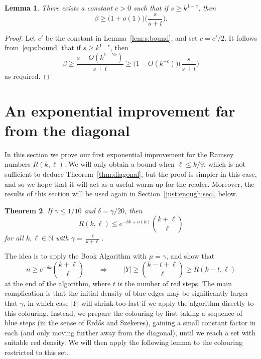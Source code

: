 \documentclass[12pt,reqno]{amsart}
\newtheorem{theorem}{Theorem}[section]
\newtheorem{lemma}[theorem]{Lemma}
\theoremstyle{definition}
\theoremstyle{remark}
\newcommand\N{\mathbb{N}}
\renewcommand{\le}{\leqslant}
\renewcommand{\ge}{\geqslant}
\def\N{\mathbb{N}}
\begin{document}
\begin{lemma}\label{lem:beta:bound}
There exists a constant $c > 0$ such that if $s \ge k^{1-c}$, then
$$\beta \ge \big(1 + o(1) \big) \bigg( \frac{s}{s + t} \bigg).$$ %
\end{lemma}

\begin{proof}
Let $c'$ be the constant in Lemma~\ref{lem:s:bound}, and set $c = c'/2$. It follows from~\eqref{eq:s:bound} that if $s \ge k^{1-c}$, then
$$\beta \ge \frac{s - O(k^{1-2c})}{s+t} \ge \big(1 - O(k^{-c}) \big) \bigg( \frac{s}{s + t} \bigg)$$
as required.
\end{proof}





\section{An exponential improvement far from the diagonal}\label{simple:sec}

In this section we prove our first exponential improvement for the Ramsey numbers $R(k,\ell)$. We will only obtain a bound when $\ell \le k/9$, which is not sufficient to deduce Theorem~\ref{thm:diagonal}, but the proof is simpler in this case, and so we hope that it will act as a useful warm-up for the reader. Moreover, the results of this section will be used again in Section~\ref{just:enough:sec}, below.   

\begin{theorem}\label{thm:off:diagonal:weak}
If\/ $\gamma \le 1/10$ and $\delta = \gamma/20$, then 
$$R(k,\ell) \le e^{-\delta k + o(k)} {k + \ell \choose \ell}$$
for all %
$k,\ell \in \N$ with $\gamma = \frac{\ell}{k+\ell}$. 
\end{theorem}

The idea is to apply the Book Algorithm with $\mu = \gamma$, and show that 
$$n \ge e^{-\delta k} {k + \ell \choose \ell} \qquad \Rightarrow \qquad |Y| \ge {k-t+\ell \choose \ell} \ge R(k-t,\ell)$$
at the end of the algorithm, where $t$ is the number of red steps. The main complication is that the initial density of blue edges may be significantly larger that $\gamma$, in which case $|Y|$ will shrink too fast if we apply the algorithm directly to this colouring. Instead, we prepare the colouring by first taking a sequence of blue steps (in the sense of Erd\H{o}s and Szekeres), gaining a small constant factor in each (and only moving further away from the diagonal), until we reach a set with suitable red density. 
We will then apply the following lemma to the colouring restricted to this set.
\end{document}
